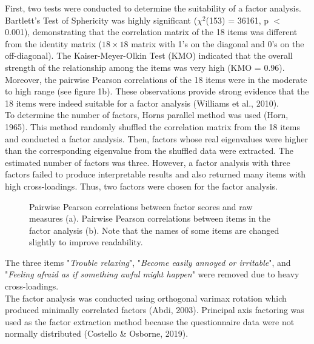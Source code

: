 \documentclass[11pt, a4paper]{article}
\begin{document}
First, two tests were conducted to determine the suitability of a factor analysis. Bartlett’s Test of Sphericity was highly significant ($\chi^2$(153) = 36161, p $<$ 0.001), demonstrating that the correlation matrix of the 18 items was different from the identity matrix ($18\times 18$ matrix with 1's on the diagonal and 0's on the off-diagonal). The Kaiser-Meyer-Olkin Test (KMO) indicated that the overall strength of the relationship among the items was very high (KMO = 0.96). Moreover, the pairwise Pearson correlations of the 18 items were in the moderate to high range (see figure 1b). These observations provide strong evidence that the 18 items were indeed suitable for a factor analysis (Williams et al., 2010). \\

To determine the number of factors, Horns parallel method was used (Horn, 1965). This method randomly shuffled the correlation matrix from the 18 items and conducted a factor analysis. Then, factors whose real eigenvalues were higher than the corresponding eigenvalue from the shuffled data were extracted. The estimated number of factors was three. However, a factor analysis with three factors failed to produce interpretable results and also returned many items with high cross-loadings. Thus, two factors were chosen for the factor analysis. \\

\begin{figure}
\centering
\vspace{-1cm}

\caption{\label{fig:data} Pairwise Pearson correlations between factor scores and raw measures (a). Pairwise Pearson correlations between items in the factor analysis (b). Note that the names of some items are changed slightly to improve readability. }
\end{figure}

The three items "\textit{Trouble relaxing}", "\textit{Become easily annoyed or irritable}", and "\textit{Feeling afraid as if something awful might happen}" were removed due to heavy cross-loadings. \\
The factor analysis was conducted using orthogonal varimax rotation which produced minimally correlated factors (Abdi, 2003). Principal axis factoring was used as the factor extraction method because the questionnaire data were not normally distributed (Costello \& Osborne, 2019). \\
\end{document}
